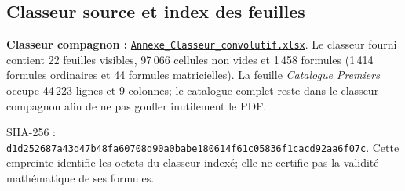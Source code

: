 \documentclass[11pt,a4paper]{article}
\begin{document}
\subsection{Classeur source et index des feuilles}
\textbf{Classeur compagnon :}
\href{run:assets/Annexe_Classeur_convolutif.xlsx}
{\texttt{Annexe\_Classeur\_convolutif.xlsx}}.
Le classeur fourni contient 22 feuilles visibles, 97\,066 cellules non vides
et 1\,458 formules (1\,414 formules ordinaires et 44 formules matricielles).
La feuille \emph{Catalogue Premiers} occupe
44\,223 lignes et 9 colonnes; le catalogue complet reste dans le classeur
compagnon afin de ne pas gonfler inutilement le PDF.

\begin{boiteformule}
SHA-256 :
\texttt{d1d252687a43d47b48fa60708d90a0babe180614f61c05836f1cacd92aa6f07c}.
Cette empreinte identifie les octets du classeur indexé; elle ne certifie pas
la validité mathématique de ses formules.
\end{boiteformule}
\end{document}
